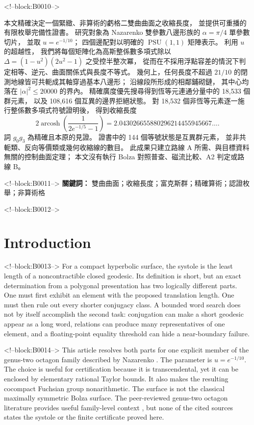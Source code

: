 \documentclass[11pt,a4paper]{article}
\theoremstyle{definition}
\newcommand{\PSU}{\operatorname{PSU}}
\begin{document}
<!--block:B0010-->
{\cjkfont
\par{}\medskip
\raggedright
本文精確決定一個緊緻、非算術的虧格二雙曲曲面之收縮長度，\allowbreak
並提供可重播的有限枚舉完備性證書。\allowbreak
研究對象為 Nazarenko 雙參數八邊形族的 \(\alpha=\pi/4\) 單參數切片，\allowbreak
並取 \(u=e^{-1/10}\)；\allowbreak
四個邊配對以明確的 \(\PSU(1,1)\) 矩陣表示。\allowbreak
利用 \(u\) 的超越性，\allowbreak
我們將每個矩陣化為高斯整係數多項式除以
\(\Delta=(1-u^2)(2u^2-1)\) 之受控半整次冪，\allowbreak
從而在不採用浮點容差的情況下判定相等、逆元、曲面關係式與長度不等式。\allowbreak
幾何上，任何長度不超過 \(21/10\) 的閉測地線皆可共軛成其軸穿過基本八邊形；\allowbreak
沿線段所形成的相鄰鋪砌鏈，\allowbreak
其中心均落在 \(\lvert\alpha\rvert^2\leq20000\) 的界內。\allowbreak
精確廣度優先搜尋得到恆等元連通分量中的 18,533 個群元素，\allowbreak
以及 108,616 個互異的邊界拒絕狀態。\allowbreak
對 18,532 個非恆等元素逐一施行整係數多項式符號證明後，\allowbreak
得到收縮長度
\[
2\operatorname{arcosh}\!\left(\frac{1}{2e^{-1/5}-1}\right)
=2.043026655880296214455945667\ldots .
\]
詞 \(g_0g_3\) 為精確且本原的見證。\allowbreak
證書中的 144 個等號狀態是互異群元素，\allowbreak
並非共軛類、反向等價類或幾何收縮線的數目。\allowbreak
此成果只建立路線 A 所需、與目標資料無關的控制曲面定理；\allowbreak
本文沒有執行 Bolza 對照普查、磁流比較、A2 判定或路線 B。

<!--block:B0011-->
\noindent\textbf{關鍵詞：} 雙曲曲面；收縮長度；富克斯群；精確算術；認證枚舉；非算術格
}

<!--block:B0012-->
\section{Introduction}

<!--block:B0013-->
For a compact hyperbolic surface, the systole is the least length of a
noncontractible closed geodesic.  Its definition is short, but an exact
determination from a polygonal presentation has two logically different
parts.  One must first exhibit an element with the proposed translation
length.  One must then rule out every shorter conjugacy class.  A bounded
word search does not by itself accomplish the second task: conjugation can
make a short geodesic appear as a long word, relations can produce many
representatives of one element, and a floating-point equality threshold can
hide a near-boundary failure.

<!--block:B0014-->
This article resolves both parts for one explicit member of the genus-two
octagon family described by Nazarenko 
\cite[eqs.~(10)--(18)]{Nazarenko2013}.  The parameter is
\(u=e^{-1/10}\).  The choice is useful for certification because it is
transcendental, yet it can be enclosed by elementary rational Taylor bounds.
It also makes the resulting cocompact Fuchsian group nonarithmetic.  The
surface is not the classical maximally symmetric Bolza surface.  The
peer-reviewed genus-two octagon literature provides useful family-level
context \cite[abstract]{AigonDupuyEtAl2005}, but none of the cited sources states
the systole or the finite certificate proved here.
\end{document}
